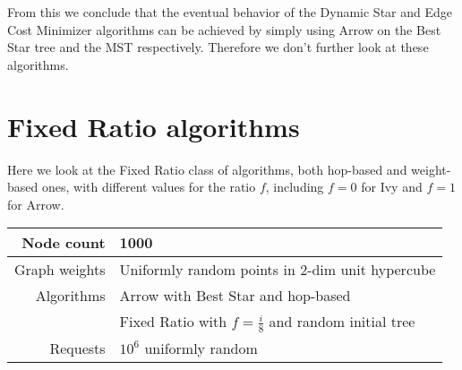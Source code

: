 \documentclass[a4paper, oneside]{discothesis}
\begin{document}
From this we conclude that the eventual behavior of the Dynamic Star and Edge Cost Minimizer algorithms can be achieved by simply using Arrow on the Best Star tree and the MST respectively. Therefore we don't further look at these algorithms.

\section{Fixed Ratio algorithms}

Here we look at the Fixed Ratio class of algorithms, both hop-based and weight-based ones, with different values for the ratio $f$, including $f=0$ for Ivy and $f=1$ for Arrow.

\begin{tabular}{ r | l }
  Node count & 1000 \\ \hline
  Graph weights & Uniformly random points in 2-dim unit hypercube \\ \hline
  Algorithms & Arrow with Best Star and hop-based \\
  & Fixed Ratio with $f=\frac{i}{8}$ and random initial tree \\ \hline
  Requests & $10^6$ uniformly random \\
\end{tabular}

\end{document}
